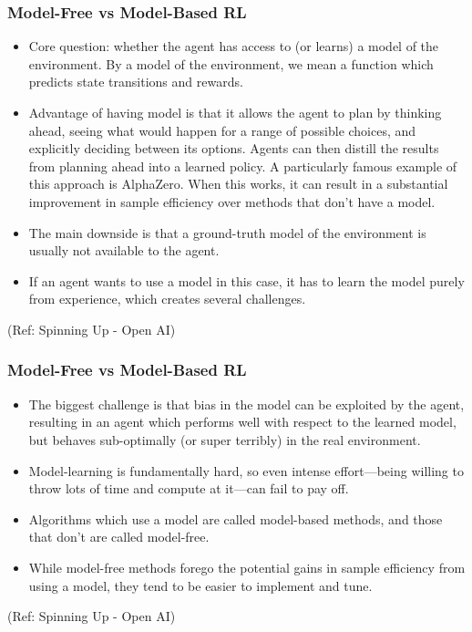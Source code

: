 \begin{frame}[fragile]\frametitle{Model-Free vs Model-Based RL}

\begin{itemize}
\item Core question: whether the agent has access to (or learns) a model of the environment. By a model of the environment, we mean a function which predicts state transitions and rewards.
\item Advantage of having model is that it allows the agent to plan by thinking ahead, seeing what would happen for a range of possible choices, and explicitly deciding between its options. Agents can then distill the results from planning ahead into a learned policy. A particularly famous example of this approach is AlphaZero. When this works, it can result in a substantial improvement in sample efficiency over methods that don’t have a model.
\item The main downside is that a ground-truth model of the environment is usually not available to the agent. 
\item If an agent wants to use a model in this case, it has to learn the model purely from experience, which creates several challenges. 

\end{itemize}

{\tiny (Ref: Spinning Up - Open AI)}
\end{frame}

\begin{frame}[fragile]\frametitle{Model-Free vs Model-Based RL}

\begin{itemize}
\item The biggest challenge is that bias in the model can be exploited by the agent, resulting in an agent which performs well with respect to the learned model, but behaves sub-optimally (or super terribly) in the real environment. 
\item Model-learning is fundamentally hard, so even intense effort—being willing to throw lots of time and compute at it—can fail to pay off.
\item Algorithms which use a model are called model-based methods, and those that don’t are called model-free. 
\item While model-free methods forego the potential gains in sample efficiency from using a model, they tend to be easier to implement and tune.
\end{itemize}

{\tiny (Ref: Spinning Up - Open AI)}
\end{frame}

